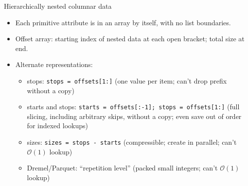 \documentclass[aspectratio=169]{beamer}
\begin{document}
\begin{frame}{Hierarchically nested columnar data}
\begin{itemize}
\item<3-> Each primitive attribute is in an array by itself, with no list boundaries.
\item<4-> Offset array: starting index of nested data at each open bracket; total size at end.
\item<5-> Alternate representations:
\begin{itemize}
\item<5-> stops: {\tt\scriptsize stops = offsets[1:]} (one value per item; can't drop prefix without a copy)
\item<6-> starts and stops: {\tt\scriptsize starts = offsets[:-1]; stops = offsets[1:]} (full slicing, including arbitrary skips, without a copy; even save out of order for indexed lookups)
\item<7-> sizes: {\tt\scriptsize sizes = stops - starts} (compressible; create in parallel; can't $\mathcal{O}(1)$ lookup)
\item<8-> Dremel/Parquet: ``repetition level'' (packed small integers; can't $\mathcal{O}(1)$ lookup)
\end{itemize}
\end{itemize}
\end{frame}

\begin{frame}{}
\vspace{0.5 cm}

\end{frame}
\end{document}
